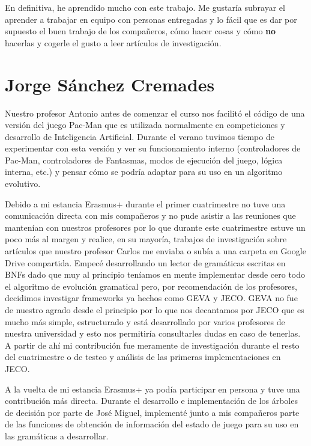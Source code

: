 En definitiva, he aprendido mucho con este trabajo. Me gustaría subrayar el aprender a trabajar en equipo con personas entregadas y lo fácil que es dar por supuesto el buen trabajo de los compañeros, cómo hacer cosas y cómo \textbf{no} hacerlas y cogerle el gusto a leer artículos de investigación.

\section{Jorge Sánchez Cremades}
Nuestro profesor Antonio antes de comenzar el curso nos facilitó el código de una versión del juego Pac-Man que es utilizada normalmente en competiciones y desarrollo de Inteligencia Artificial. Durante el verano tuvimos tiempo de experimentar con esta versión y ver su funcionamiento interno (controladores de Pac-Man, controladores de Fantasmas, modos de ejecución del juego, lógica interna, etc.) y pensar cómo se podría adaptar para su uso en un algoritmo evolutivo.

Debido a mi estancia Erasmus+ durante el primer cuatrimestre no tuve una comunicación directa con mis compañeros y no pude asistir a las reuniones que mantenían con nuestros profesores por lo que durante este cuatrimestre estuve un poco más al margen y realice, en su mayoría, trabajos de investigación sobre artículos que nuestro profesor Carlos me enviaba o subía a una carpeta en Google Drive compartida. Empecé desarrollando un lector de gramáticas escritas en BNFs dado que muy al principio teníamos en mente implementar desde cero todo el algoritmo de evolución gramatical pero, por recomendación de los profesores, decidimos investigar frameworks ya hechos como GEVA y JECO. GEVA no fue de nuestro agrado desde el principio por lo que nos decantamos por JECO que es mucho más simple, estructurado y está desarrollado por varios profesores de nuestra universidad y esto nos permitiría consultarles dudas en caso de tenerlas. A partir de ahí mi contribución fue meramente de investigación durante el resto del cuatrimestre o de testeo y análisis de las primeras implementaciones en JECO.

A la vuelta de mi estancia Erasmus+ ya podía participar en persona y tuve una contribución más directa. Durante el desarrollo e implementación de los árboles de decisión por parte de José Miguel, implementé junto a mis compañeros parte de las funciones de obtención de información del estado de juego para su uso en las gramáticas a desarrollar.


